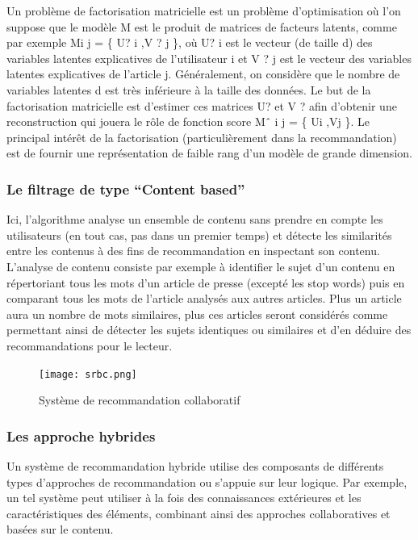 \noindent 

Un problème de factorisation matricielle est un problème d’optimisation où l’on suppose que le modèle M est le produit de matrices de facteurs latents, comme par exemple Mi j = \{ U? i ,V ? j \}, où U? i est le vecteur (de taille d) des variables latentes explicatives de l’utilisateur i et V ? j est le vecteur des variables latentes explicatives de l’article j.  Généralement, on considère que le nombre de variables latentes d est très inférieure à la taille des données. Le but de la factorisation matricielle est d’estimer ces matrices U? et V ? afin d’obtenir une reconstruction qui jouera le rôle de fonction score Mˆ i j = \{ Ui ,Vj \}. Le principal intérêt de la factorisation (particulièrement dans la recommandation) est de fournir une représentation de faible rang d’un modèle de grande dimension.
	
	\subsubsection{Le filtrage de type “Content based”}
	Ici, l’algorithme analyse un ensemble de contenu sans prendre en compte les utilisateurs (en tout cas, pas dans un premier temps) et détecte les similarités entre les contenus à des fins de recommandation en inspectant son contenu. L’analyse de contenu consiste par exemple à identifier le sujet d’un contenu en répertoriant tous les mots d’un article de presse (excepté les stop words) puis en comparant tous les mots de l’article analysés aux autres articles. Plus un article aura un nombre de mots similaires, plus ces articles seront considérés comme  permettant ainsi de détecter les sujets identiques ou similaires et d’en déduire des recommandations pour le lecteur.
	\begin{figure}[!ht]
		\centering
		\texttt{[image: srbc.png]} 
		\caption{Système de recommandation collaboratif}
		\label{ferme}
	\end{figure}
	
	\subsubsection{Les approche hybrides }
	Un système de recommandation hybride utilise des composants de différents types d’approches de recommandation ou s’appuie sur leur logique. Par exemple, un tel système peut utiliser à la fois des connaissances extérieures et les caractéristiques des éléments, combinant ainsi des approches collaboratives et basées sur le contenu. 
	
